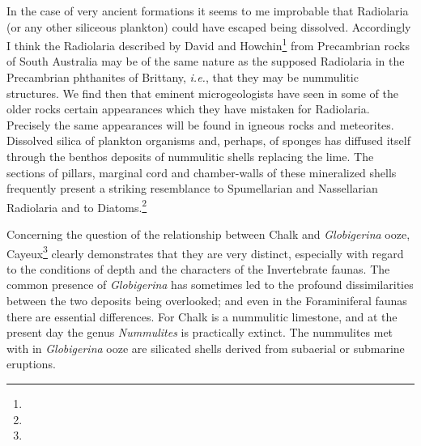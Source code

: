 \documentclass[a4paper, 12pt, oneside]{article}
\begin{document}
In the case of very ancient formations it seems to me improbable that Radiolaria (or any other siliceous plankton) could have escaped being dissolved. Accordingly I think the Radiolaria described by David and Howchin\footnote{} from Precambrian rocks of South Australia may be of the same nature as the supposed Radiolaria in the Precambrian phthanites of Brittany, \emph{i.e.}, that they may be nummulitic structures. We find then that eminent microgeologists have seen in some of the older rocks certain appearances which they have mistaken for Radiolaria. Precisely the same appearances will be found in igneous rocks and meteorites. Dissolved silica of plankton organisms and, perhaps, of sponges has diffused itself through the benthos deposits of nummulitic shells replacing the lime. The sections of pillars, marginal cord and chamber-walls of these mineralized shells frequently present a striking resemblance to Spumellarian and Nassellarian Radiolaria and to Diatoms.\footnote{}

Concerning the question of the relationship between Chalk and \emph{Globigerina} ooze, Cayeux\footnote{} clearly demonstrates that they are very distinct, especially with regard to the conditions of depth and the characters of the Invertebrate faunas. The common presence of \emph{Globigerina} has sometimes led to the profound dissimilarities between the two deposits being overlooked; and even in the Foraminiferal faunas there are essential differences. For Chalk is a nummulitic limestone, and at the present day the genus \emph{Nummulites} is practically extinct. The nummulites met with in \emph{Globigerina} ooze are silicated shells derived from subaerial or submarine eruptions.
\end{document}
